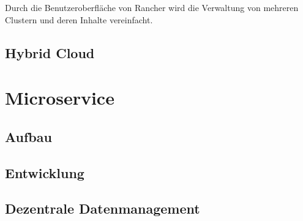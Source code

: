 Durch die Benutzeroberfläche von Rancher wird die Verwaltung
von mehreren Clustern und deren Inhalte vereinfacht. 

\subsection{Hybrid Cloud}


\section{Microservice}
\subsection{Aufbau}
\subsection{Entwicklung}
\subsection{Dezentrale Datenmanagement}



